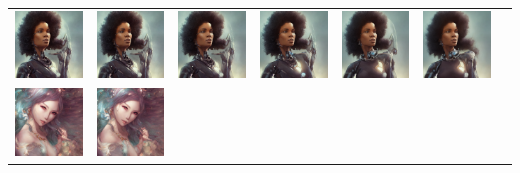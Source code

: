 \begin{table}[!htb]
\begin{tabular}{c c@{}c@{}c@{}c@{}c@{}c}
    \includegraphics[width=0.135\linewidth]{chapter/appendix/def_imgs/woman/w_10.png} &
    \includegraphics[width=0.135\linewidth]{chapter/appendix/def_imgs/woman/w_20.png} &
    \includegraphics[width=0.135\linewidth]{chapter/appendix/def_imgs/woman/w_30.png} &
    \includegraphics[width=0.135\linewidth]{chapter/appendix/def_imgs/woman/w_40.png} &
    \includegraphics[width=0.135\linewidth]{chapter/appendix/def_imgs/woman/w_50.png} &
    \includegraphics[width=0.135\linewidth]{chapter/appendix/def_imgs/woman/w_60.png} \\
    \includegraphics[width=0.135\linewidth]{chapter/appendix/def_imgs/fairy/f_0.png} & 
    \includegraphics[width=0.135\linewidth]{chapter/appendix/def_imgs/fairy/f_10.png} &

\end{tabular}
\end{table}
